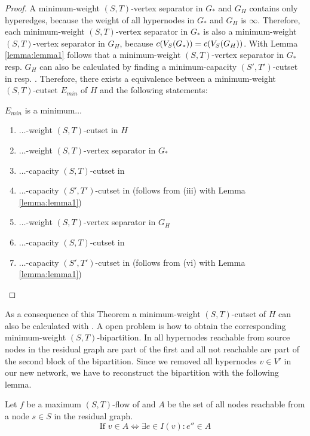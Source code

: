 \begin{proof}
A minimum-weight $(S,T)$-vertex separator in $G_*$ and $G_H$ contains only hyperedges, because
the weight of all hypernodes in $G_*$ and $G_H$ is $\infty$. Therefore, each minimum-weight
$(S,T)$-vertex separator in $G_*$ is also a minimum-weight $(S,T)$-vertex separator in $G_H$,
because $c(V_S(G_*)) = c(V_S(G_H))$. With Lemma \ref{lemma:lemma1} follows that
a minimum-weight $(S,T)$-vertex separator in $G_*$ resp. $G_H$  can also be 
calculated by finding a minimum-capacity $(S',T')$-cutset in  resp. . 
Therefore, there exists a equivalence between a minimum-weight $(S,T)$-cutset 
$E_{min}$ of $H$ and the following statements: 

$E_{min}$ is a minimum$\ldots$
\begin{enumerate}
\item $\ldots$-weight $(S,T)$-cutset in $H$
\item $\ldots$-weight $(S,T)$-vertex separator in $G_*$
\item $\ldots$-capacity $(S,T)$-cutset in 
\item $\ldots$-capacity $(S',T')$-cutset in  (follows from (iii) with Lemma \ref{lemma:lemma1})
\item $\ldots$-weight $(S,T)$-vertex separator in $G_H$
\item $\ldots$-capacity $(S,T)$-cutset in 
\item $\ldots$-capacity $(S',T')$-cutset in  (follows from (vi) with Lemma \ref{lemma:lemma1})
\end{enumerate}

\end{proof}

As a consequence of this Theorem a minimum-weight $(S,T)$-cutset of $H$ can 
also be calculated with . A open problem is how to obtain the 
corresponding minimum-weight $(S,T)$-bipartition. In  all hypernodes
reachable from source nodes in the residual graph are part of the first and 
all not reachable are part of the second block of the bipartition. Since we removed 
all hypernodes $v \in V'$ in our new network, we have to reconstruct the bipartition
with the following lemma.

\begin{lemma}
\label{lemma:bipartition_construction}
Let $f$ be a maximum $(S,T)$-flow  of  and $A$ be the set of all nodes reachable
from a node $s \in S$ in the residual graph.
\[ \text{If } v \in A \Leftrightarrow \exists e \in I(v): e'' \in A \]
\end{lemma}

